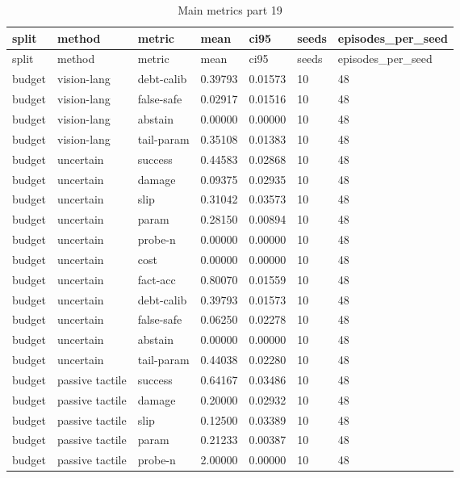 \documentclass{article}
\begin{document}
\begin{center}
\tiny
\renewcommand{\arraystretch}{0.92}
\setlength{\tabcolsep}{3pt}
\begin{longtable}{lllllll}
\caption{Main metrics part 19}\label{tab:main-metrics-19}\\
\toprule
split & method & metric & mean & ci95 & seeds & episodes\_per\_seed \\
\midrule
\endfirsthead
\toprule
split & method & metric & mean & ci95 & seeds & episodes\_per\_seed \\
\midrule
\endhead
budget & vision-lang & debt-calib & 0.39793 & 0.01573 & 10 & 48 \\
budget & vision-lang & false-safe & 0.02917 & 0.01516 & 10 & 48 \\
budget & vision-lang & abstain & 0.00000 & 0.00000 & 10 & 48 \\
budget & vision-lang & tail-param & 0.35108 & 0.01383 & 10 & 48 \\
budget & uncertain & success & 0.44583 & 0.02868 & 10 & 48 \\
budget & uncertain & damage & 0.09375 & 0.02935 & 10 & 48 \\
budget & uncertain & slip & 0.31042 & 0.03573 & 10 & 48 \\
budget & uncertain & param & 0.28150 & 0.00894 & 10 & 48 \\
budget & uncertain & probe-n & 0.00000 & 0.00000 & 10 & 48 \\
budget & uncertain & cost & 0.00000 & 0.00000 & 10 & 48 \\
budget & uncertain & fact-acc & 0.80070 & 0.01559 & 10 & 48 \\
budget & uncertain & debt-calib & 0.39793 & 0.01573 & 10 & 48 \\
budget & uncertain & false-safe & 0.06250 & 0.02278 & 10 & 48 \\
budget & uncertain & abstain & 0.00000 & 0.00000 & 10 & 48 \\
budget & uncertain & tail-param & 0.44038 & 0.02280 & 10 & 48 \\
budget & passive tactile & success & 0.64167 & 0.03486 & 10 & 48 \\
budget & passive tactile & damage & 0.20000 & 0.02932 & 10 & 48 \\
budget & passive tactile & slip & 0.12500 & 0.03389 & 10 & 48 \\
budget & passive tactile & param & 0.21233 & 0.00387 & 10 & 48 \\
budget & passive tactile & probe-n & 2.00000 & 0.00000 & 10 & 48 \\

\end{longtable}
\end{center}
\end{document}
